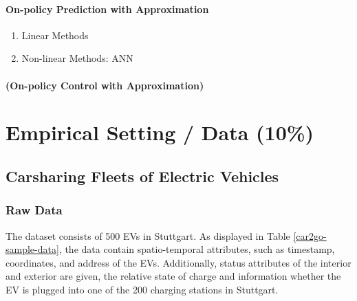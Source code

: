 \documentclass[a4paper, twoside, 12pt]{article}
\begin{document}
\paragraph{On-policy Prediction with Approximation}
\label{sec:org7accfa2}
\begin{enumerate}
\item Linear Methods
\label{sec:orgf1bb257}
\item Non-linear Methods: ANN
\label{sec:org2609662}
\end{enumerate}
\paragraph{(On-policy Control with Approximation)}
\label{sec:orgda74327}
\clearpage
\section{Empirical Setting / Data (10\%)}
\label{sec:org1ec3c6c}
\subsection{Carsharing Fleets of Electric Vehicles}
\label{sec:org6c7ebe2}
\subsubsection{Raw Data}
\label{sec:orgba8615e}
The dataset consists of 500 EVs in Stuttgart. As displayed in Table
\ref{car2go-sample-data}, the data contain spatio-temporal attributes, such as
timestamp, coordinates, and address of the EVs. Additionally, status attributes
of the interior and exterior are given, the relative state of charge and
information whether the EV is plugged into one of the 200 charging stations in
Stuttgart.
\end{document}
